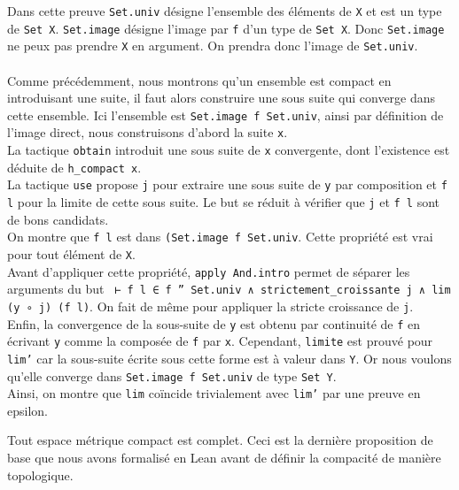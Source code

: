 \documentclass[a4paper, 12pt]{article}
\newcommand{\lean}[1]{\texttt{#1}}
\begin{document}
Dans cette preuve \lean{Set.univ} désigne l'ensemble des éléments de \lean{X} et est un type de \lean{Set X}. \lean{Set.image} désigne l'image par \lean{f} d'un type de \lean{Set X}. Donc \lean{Set.image} ne peux pas prendre \lean{X} en argument. On prendra donc l'image de \lean{Set.univ}.\\\\

Comme précédemment, nous montrons qu'un ensemble est compact en introduisant une suite, il faut alors construire une sous suite qui converge dans cette ensemble. Ici l'ensemble est \lean{Set.image f Set.univ}, ainsi par définition de l'image direct, nous construisons d'abord la suite \lean{x}.\\

La tactique \lean{obtain} introduit une sous suite de \lean{x} convergente, dont l'existence est déduite de \lean{h_compact x}.\\

La tactique \lean{use} propose \lean{j} pour extraire une sous suite de \lean{y} par composition et \lean{f l} pour la limite de cette sous suite. Le but se réduit à vérifier que \lean{j} et \lean{f l} sont de bons candidats.\\

On montre que \lean{f l} est dans \lean{(Set.image f Set.univ}. Cette propriété est vrai pour tout élément de \lean{X}. \\

Avant d'appliquer cette propriété, \lean{apply And.intro} permet de séparer les arguments du but \lean{ ⊢ f l ∈ f '' Set.univ ∧ strictement_croissante j ∧ lim (y ∘ j) (f l)}. On fait de même pour appliquer la stricte croissance de \lean{j}. \\

Enfin, la convergence de la sous-suite de \lean{y} est obtenu par continuité de \lean{f} en écrivant \lean{y} comme la composée de \lean{f} par \lean{x}. Cependant, \lean{limite} est prouvé pour \lean{lim'} car la sous-suite écrite sous cette forme est à valeur dans \lean{Y}. Or nous voulons qu'elle converge dans \lean{Set.image f Set.univ} de type \lean{Set Y}.\\

Ainsi, on montre que \lean{lim} coïncide trivialement avec \lean{lim'} par une preuve en epsilon.\\

\vspace{\baselineskip}

Tout espace métrique compact est complet. Ceci est la dernière proposition de base que nous avons formalisé en Lean avant de définir la compacité de manière topologique.
\end{document}
